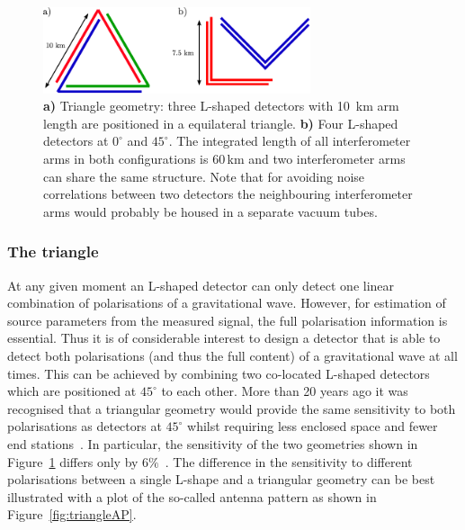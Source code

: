 \FloatBarrier
\begin{figure}[tbh]
\begin{center}
\includegraphics[width=0.7\textwidth,keepaspectratio]{Sec_Optics/TRIMI03}
\caption{{\bf a)} Triangle geometry: three L-shaped detectors with 10\, km arm length
are positioned in a equilateral triangle.
{\bf b)} Four L-shaped detectors at $0^\circ$ and $45^\circ$. The integrated length of all
interferometer arms in both configurations is 60\,km and two interferometer arms can share
the same structure. Note that for avoiding noise correlations between two detectors the
neighbouring interferometer arms would probably be housed in a separate vacuum tubes.}
\label{fig:triangle}
\end{center}
\end{figure}
\subsubsection{The triangle}
At any given moment an L-shaped detector can only detect one linear combination of polarisations of a
gravitational wave. However, for
estimation of source parameters from the measured signal, the full polarisation information is essential.
Thus it is of considerable interest to design a detector that is able to detect both polarisations (and thus the full content)
of a gravitational wave at all times. This can be achieved by combining two co-located
L-shaped detectors which are positioned at $45^\circ$ to each other. %
More than 20 years ago it was recognised that a triangular geometry would provide the same
sensitivity to both polarisations as detectors at $45^\circ$ whilst requiring less enclosed space and fewer
end stations~\cite{Winkler1985}. In particular, the sensitivity of the two geometries shown
in Figure~\ref{fig:triangle} differs only by $6\%$~\cite{Freise2009}. The difference in the sensitivity to
different polarisations between a single L-shape and a triangular geometry can be best illustrated
with a plot of the so-called antenna pattern as shown in Figure~\ref{fig:triangleAP}.


